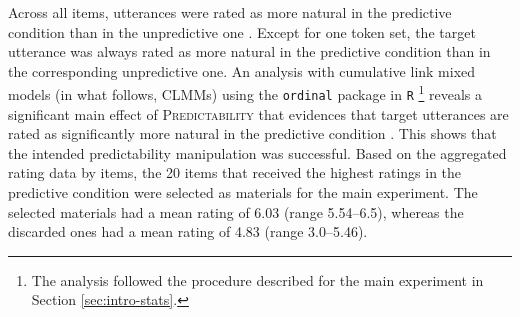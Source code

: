 Across all items, utterances were rated as more natural in the predictive condition  than in the unpredictive one . 
Except for one token set, the target utterance was always rated as more natural in the predictive condition than in the corresponding unpredictive one. An analysis with cumulative link mixed models (in what follows, CLMMs) using the \texttt{ordinal} package \citep{christensen2015} in \texttt{R} \citep{rcoreteam2019}%
%
\footnote{The analysis followed the procedure described for the main experiment in Section \ref{sec:intro-stats}.}\afterfn%
%
reveals a significant main effect of \textsc{Predictability} that evidences that target utterances are rated as significantly more natural in the predictive condition . This shows that the intended predictability manipulation was successful. Based on the aggregated rating data by items, the 20 items that received the highest ratings in the predictive condition were selected as materials for the main experiment. The selected materials had a mean rating of 6.03 (range 5.54--6.5), whereas the discarded ones had a mean rating of 4.83 (range 3.0--5.46).

